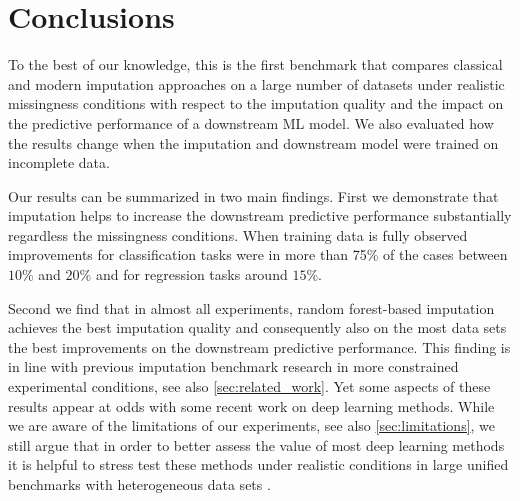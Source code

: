 \section{Conclusions}
\label{sec:conclusion}
%
To the best of our knowledge, this is the first benchmark that compares classical and modern imputation approaches on a large number of datasets under realistic missingness conditions with respect to the imputation quality and the impact on the predictive performance of a downstream ML model. We also evaluated how the results change when the imputation and downstream model were trained on incomplete data.

Our results can be summarized in two main findings. First we demonstrate that imputation helps to increase the downstream predictive performance substantially regardless the missingness conditions. When training data is fully observed improvements for classification tasks were in more than 75\% of the cases between $10\%$ and $20\%$ and for regression tasks around $15\%$. 

Second we find that in almost all experiments, random forest-based imputation achieves the best imputation quality and consequently also on the most data sets the best improvements on the downstream predictive performance. This finding is in line with previous imputation benchmark research in more constrained experimental conditions, see also \autoref{sec:related_work}. Yet some aspects of these results appear at odds with some recent work on deep learning methods. While we are aware of the limitations of our experiments, see also \autoref{sec:limitations}, we still argue that in order to better assess the value of most deep learning methods it is helpful to stress test these methods under realistic conditions in large unified benchmarks with heterogeneous data sets \citep{Sculley2018, Bender2021}.

